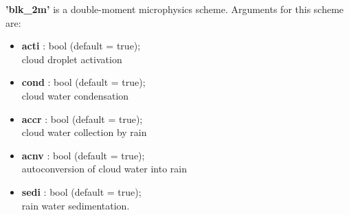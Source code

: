 \documentclass[11pt]{article}
\begin{document}
\begin{itemize}
\textbf{'blk\_2m'} is a double-moment microphysics scheme. Arguments for this scheme are:
\begin{itemize}[label=$\bullet$]
\item \textbf{acti} : bool (default = true); \\ cloud droplet activation
\item \textbf{cond} : bool (default = true); \\ cloud water condensation
\item \textbf{accr} : bool (default = true); \\ cloud water collection by rain
\item \textbf{acnv} : bool (default = true); \\ autoconversion of cloud water into rain
\item \textbf{sedi} : bool (default = true); \\ rain water sedimentation.
\end{itemize}


\end{itemize}
\end{document}
